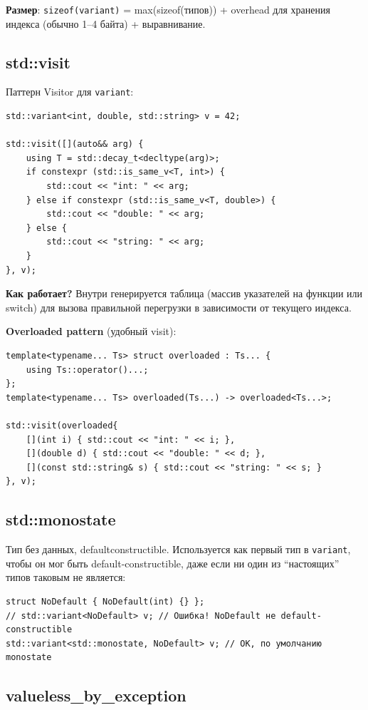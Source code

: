 \documentclass[12pt,a4paper]{article}
\begin{document}
\textbf{Размер}: \texttt{sizeof(variant)} = max(sizeof(типов)) + overhead для хранения индекса (обычно 1--4 байта) + выравнивание.

\subsection{std::visit}

Паттерн Visitor для \texttt{variant}:
\begin{lstlisting}
std::variant<int, double, std::string> v = 42;

std::visit([](auto&& arg) {
    using T = std::decay_t<decltype(arg)>;
    if constexpr (std::is_same_v<T, int>) {
        std::cout << "int: " << arg;
    } else if constexpr (std::is_same_v<T, double>) {
        std::cout << "double: " << arg;
    } else {
        std::cout << "string: " << arg;
    }
}, v);
\end{lstlisting}

\textbf{Как работает?} Внутри генерируется таблица (массив указателей на функции или switch) для вызова правильной перегрузки в зависимости от текущего индекса.

\textbf{Overloaded pattern} (удобный visit):
\begin{lstlisting}
template<typename... Ts> struct overloaded : Ts... {
    using Ts::operator()...;
};
template<typename... Ts> overloaded(Ts...) -> overloaded<Ts...>;

std::visit(overloaded{
    [](int i) { std::cout << "int: " << i; },
    [](double d) { std::cout << "double: " << d; },
    [](const std::string& s) { std::cout << "string: " << s; }
}, v);
\end{lstlisting}

\subsection{std::monostate}

Тип без данных, defaultconstructible. Используется как первый тип в \texttt{variant}, чтобы он мог быть default-constructible, даже если ни один из ``настоящих'' типов таковым не является:
\begin{lstlisting}
struct NoDefault { NoDefault(int) {} };
// std::variant<NoDefault> v; // Ошибка! NoDefault не default-constructible
std::variant<std::monostate, NoDefault> v; // OK, по умолчанию monostate
\end{lstlisting}

\subsection{valueless\_by\_exception}
\end{document}

